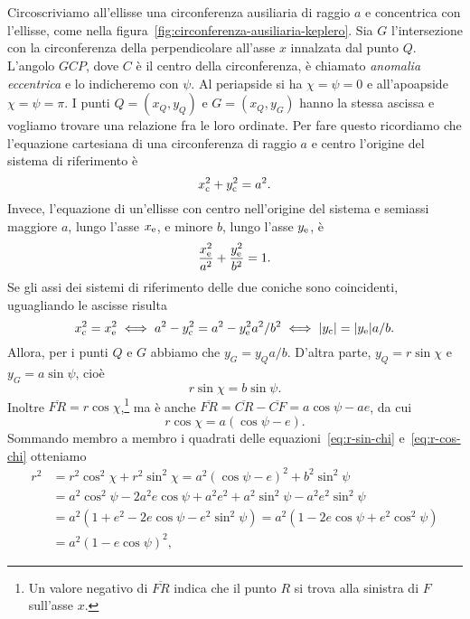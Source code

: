 Circoscriviamo all'ellisse una circonferenza ausiliaria di raggio $a$ e
concentrica con l'ellisse, come nella
figura~\ref{fig:circonferenza-ausiliaria-keplero}.  Sia $G$ l'intersezione con
la circonferenza della perpendicolare all'asse $x$ innalzata dal punto
$Q$. L'angolo $G\widehat{C}P$, dove $C$ è il centro della circonferenza, è
chiamato \emph{anomalia eccentrica} e lo indicheremo con $\psi$. Al periapside
si ha $\chi = \psi = 0$ e all'apoapside $\chi = \psi = \pi$. I punti
$Q=(x_Q,y_Q)$ e $G=(x_Q,y_G)$ hanno la stessa ascissa e vogliamo trovare una
relazione fra le loro ordinate. Per fare questo ricordiamo che l'equazione
cartesiana di una circonferenza di raggio $a$ e centro l'origine del sistema di
riferimento è
\begin{equation}
  x_\textup{c}^2 + y_\textup{c}^2 = a^2.
\end{equation}
Invece, l'equazione di un'ellisse con centro nell'origine del sistema e semiassi
maggiore $a$, lungo l'asse $x_\textup{e}$, e minore $b$, lungo l'asse
$y_\textup{e}$, è
\begin{equation}
    \frac{x_\textup{e}^2}{a^2} + \frac{y_\textup{e}^2}{b^2} = 1.
\end{equation}
Se gli assi dei sistemi di riferimento delle due coniche sono coincidenti,
uguagliando le ascisse risulta
\begin{equation}
  x_\textup{c}^2 = x_\textup{e}^2 \iff a^2 - y_\textup{c}^2 = a^2 -
  y_\textup{e}^2a^2/b^2 \iff \lvert y_\textup{c}\rvert = \lvert y_\textup{e}\rvert a/b.
\end{equation}
Allora, per i punti $Q$ e $G$ abbiamo che $y_G = y_Qa/b$. D'altra parte,
$y_Q = r\sin\chi$ e $y_G = a\sin\psi$, cioè
\begin{equation}
  \label{eq:r-sin-chi}
  r\sin\chi = b\sin\psi.
\end{equation}
Inoltre $\overline{FR} =
r\cos\chi$,\footnote{Un
  valore negativo di $\overline{FR}$ indica che il punto $R$ si trova alla
  sinistra di $F$ sull'asse $x$.} ma è anche $\overline{FR} = \overline{CR} -
\overline{CF} = a\cos\psi - ae$, da cui
\begin{equation}
  \label{eq:r-cos-chi}
  r\cos\chi = a(\cos\psi - e).
\end{equation}
Sommando membro a membro i quadrati delle equazioni~\eqref{eq:r-sin-chi}
e~\eqref{eq:r-cos-chi} otteniamo
\begin{equation}
  \begin{split}
    r^2 &= r^2\cos^2\chi + r^2\sin^2\chi = a^2(\cos\psi - e)^2 + b^2\sin^2\psi\\
    &= a^2\cos^2\psi-2a^2e\cos\psi+a^2e^2+a^2\sin^2\psi-a^2e^2\sin^2\psi\\
    &= a^2(1+e^2-2e\cos\psi-e^2\sin^2\psi) = a^2(1-2e\cos\psi+e^2\cos^2\psi)\\
    &= a^2(1 - e\cos\psi)^2,
  \end{split}
\end{equation}
